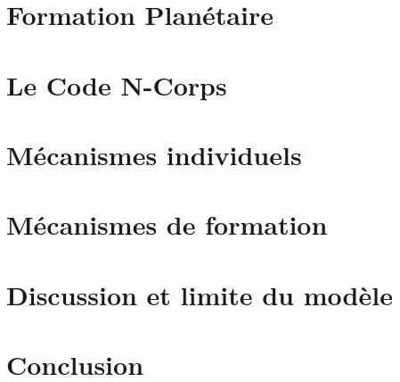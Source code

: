\documentclass[logos,chaptertoc]{bordeaux-thesis}
\begin{document}






\chapter{Formation Planétaire}



\chapter{Le Code N-Corps}\label{sec:code_n-corps}



\chapter{Mécanismes individuels}



\chapter{Mécanismes de formation}



\chapter{Discussion et limite du modèle}\label{sec:discussion}



\chapter*{Conclusion}



\appendix






\end{document}
